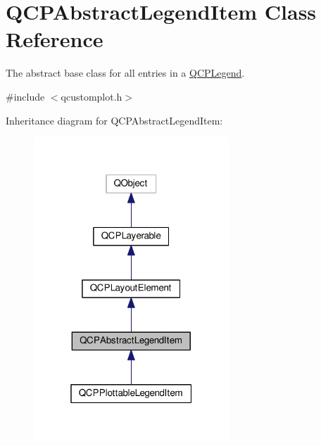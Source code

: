 \hypertarget{classQCPAbstractLegendItem}{}\section{Q\+C\+P\+Abstract\+Legend\+Item Class Reference}
\label{classQCPAbstractLegendItem}


The abstract base class for all entries in a \hyperlink{classQCPLegend}{Q\+C\+P\+Legend}.  




{\ttfamily \#include $<$qcustomplot.\+h$>$}



Inheritance diagram for Q\+C\+P\+Abstract\+Legend\+Item\+:
\nopagebreak
\begin{figure}[H]
\begin{center}
\leavevmode
\includegraphics[width=208pt]{classQCPAbstractLegendItem__inherit__graph}
\end{center}
\end{figure}


